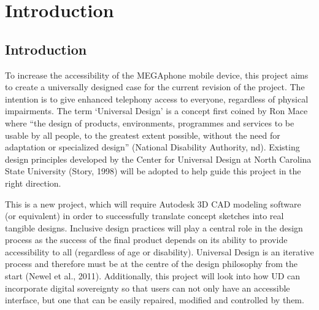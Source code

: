 
\chapter{Introduction}\label{chapter:firstchapter} %

\label{Chapter1} %


\section{Introduction}\label{sec:firstsection}


To increase the accessibility of the MEGAphone mobile device, this project aims to create a universally designed case for the current revision of the project.
The intention is to give enhanced telephony access to everyone, regardless of physical impairments. 
The term ‘Universal Design’ is a concept first coined by Ron Mace where “the design of products, environments, programmes and services to be usable by all people, to the greatest extent possible, without the need for adaptation or specialized design” (National Disability Authority, nd). 
Existing design principles developed by the Center for Universal Design at North Carolina State University (Story, 1998) will be adopted to help guide this project in the right direction.

    This is a new project, which will require Autodesk 3D CAD modeling software (or equivalent) in order to successfully translate concept sketches into real tangible designs. 
Inclusive design practices will play a central role in the design process as the success of the final product depends on its ability to provide accessibility to all (regardless of age or disability). 
Universal Design is an iterative process and therefore must be at the centre of the design philosophy from the start (Newel et al., 2011). 
Additionally, this project will look into how UD can incorporate digital sovereignty so that users can not only have an accessible interface, but one that can be easily repaired, modified and controlled by them.

